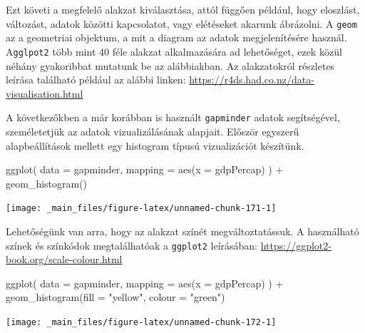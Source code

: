 \documentclass[
]{book}
\newenvironment{Shaded}{\begin{snugshade}}{\end{snugshade}}
\newcommand{\AttributeTok}[1]{\textcolor[rgb]{0.77,0.63,0.00}{#1}}
\newcommand{\FunctionTok}[1]{\textcolor[rgb]{0.00,0.00,0.00}{#1}}
\newcommand{\NormalTok}[1]{#1}
\newcommand{\SpecialCharTok}[1]{\textcolor[rgb]{0.00,0.00,0.00}{#1}}
\newcommand{\StringTok}[1]{\textcolor[rgb]{0.31,0.60,0.02}{#1}}
\begin{document}
Ezt követi a megfelelő alakzat kiválasztása, attól függően például, hogy
eloszlást, változást, adatok közötti kapcsolatot, vagy elétéseket
akarunk ábrázolni. A \texttt{geom} az a geometriai objektum, a mit a
diagram az adatok megjelenítésére használ. A\texttt{gglpot2} több mint
40 féle alakzat alkalmazására ad lehetőséget, ezek közül néhány
gyakoribbat mutatunk be az alábbiakban. Az alakzatokról részletes
leírása található például az alábbi linken:
\url{https://r4ds.had.co.nz/data-visualisation.html}

A következőkben a már korábban is használt \texttt{gapminder} adatok
segítségével, személetetjük az adatok vizualizálásának alapjait. Először
egyszerű alapbeállítások mellett egy histogram típusú vizualizációt
készítünk.

\begin{Shaded}
\begin{Highlighting}[]
\FunctionTok{ggplot}\NormalTok{(}
  \AttributeTok{data =}\NormalTok{ gapminder, }
  \AttributeTok{mapping =} \FunctionTok{aes}\NormalTok{(}\AttributeTok{x =}\NormalTok{ gdpPercap)}
\NormalTok{) }\SpecialCharTok{+} 
  \FunctionTok{geom\_histogram}\NormalTok{() }
\end{Highlighting}
\end{Shaded}

\begin{center}\texttt{[image: \_main\_files/figure-latex/unnamed-chunk-171-1]} \end{center}

Lehetőségünk van arra, hogy az alakzat színét megváltoztatássuk. A
használható színek és színkódok megtalálhatóak a \texttt{ggplot2}
leírásában: \url{https://ggplot2-book.org/scale-colour.html}

\begin{Shaded}
\begin{Highlighting}[]
\FunctionTok{ggplot}\NormalTok{(}
  \AttributeTok{data =}\NormalTok{ gapminder,}
  \AttributeTok{mapping =} \FunctionTok{aes}\NormalTok{(}\AttributeTok{x =}\NormalTok{ gdpPercap)}
\NormalTok{) }\SpecialCharTok{+}
  \FunctionTok{geom\_histogram}\NormalTok{(}\AttributeTok{fill =} \StringTok{"yellow"}\NormalTok{, }\AttributeTok{colour =} \StringTok{"green"}\NormalTok{) }
\end{Highlighting}
\end{Shaded}

\begin{center}\texttt{[image: \_main\_files/figure-latex/unnamed-chunk-172-1]} \end{center}
\end{document}
